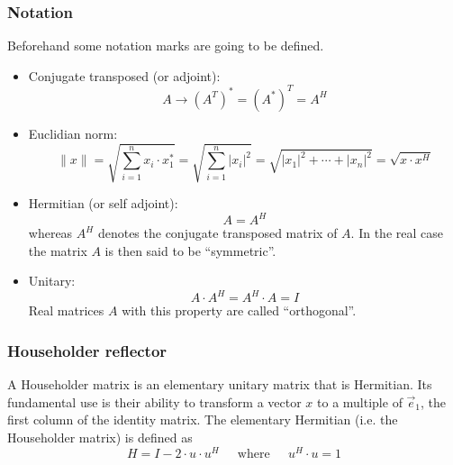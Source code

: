 \subsubsection{Notation}

Beforehand some notation marks are going to be defined.

\begin{itemize}

\item Conjugate transposed (or adjoint):
\begin{equation*}
A \rightarrow \left(A^T\right)^* = \left(A^*\right)^T = A^H
\end{equation*}


\item Euclidian norm:
\begin{equation*}
\lVert x \rVert = \sqrt{\sum^n_{i=1} x_i\cdot x^*_1} =
\sqrt{\sum^n_{i=1} \lvert x_i\rvert^2} = 
\sqrt{\lvert x_1\rvert^2 + \cdots  + \lvert x_n\rvert^2} = 
\sqrt{x\cdot x^H}
\end{equation*}

\item Hermitian (or self adjoint):
\begin{equation*}
A = A^H
\end{equation*}
whereas $A^H$ denotes the conjugate transposed matrix of $A$.  In the
real case the matrix $A$ is then said to be ``symmetric''.

\item Unitary:
\begin{equation*}
A\cdot A^H = A^H\cdot A = I
\end{equation*}
Real matrices $A$ with this property are called ``orthogonal''.

\end{itemize}

\subsubsection{Householder reflector}

A Householder matrix is an elementary unitary matrix that is
Hermitian.  Its fundamental use is their ability to transform a vector
$x$ to a multiple of $\vec{e}_1$, the first column of the identity
matrix.  The elementary Hermitian (i.e. the Householder matrix) is
defined as
\begin{equation}
H = I - 2\cdot u\cdot u^H
\;\;\;\;
\textrm{ where }
\;\;\;\;
u^H\cdot u = 1
\end{equation}

